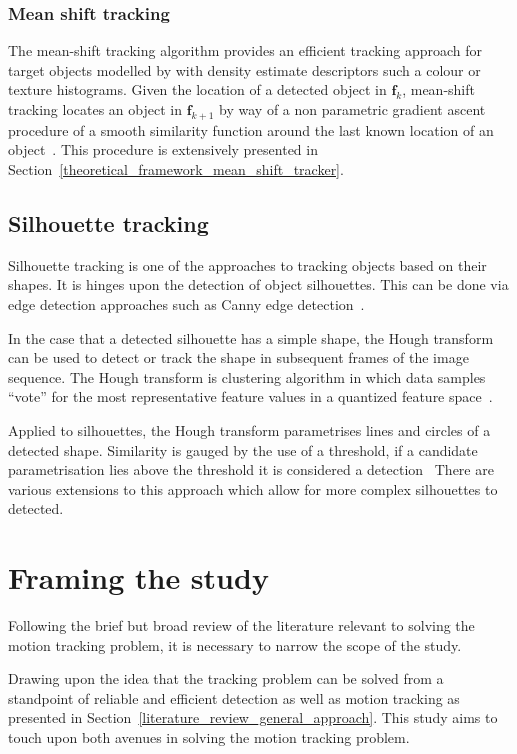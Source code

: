\subsubsection{Mean shift tracking}\label{literature_review_mean_shift}
The mean-shift tracking algorithm provides an efficient tracking approach for
target objects modelled by with density estimate descriptors such a colour or
texture histograms. 
Given the location of a detected object in $\mathbf{f}_k$, mean-shift tracking
locates an object in $\mathbf{f}_{k+1}$ by way of a
non parametric gradient ascent procedure of a smooth similarity function around
the last known location of an object~\cite{Comaniciu2003}. This procedure is
extensively presented in Section~\ref{theoretical_framework_mean_shift_tracker}.

\subsection{Silhouette tracking}
Silhouette tracking is one of the approaches to tracking objects based on their
shapes. It is hinges upon the detection of object silhouettes.  This can be done
via edge detection approaches such as Canny edge
detection~\cite{Delprado2013}.

In the case that a detected silhouette has a simple shape, the Hough transform
can be used to detect or track the shape in subsequent frames of the image
sequence. The Hough transform is clustering algorithm in which data samples
“vote” for the most representative feature values in a quantized feature
space~\cite{Tekalp2014}. 

Applied to silhouettes, the Hough transform parametrises lines and circles of a
detected shape. Similarity is gauged by the use of a threshold, if a candidate
parametrisation lies above the threshold it is considered a
detection~\cite{Delprado2013} There are various extensions to this approach
which allow for more complex silhouettes to detected. 

\section{Framing the study}\label{literature_review}
Following the brief but broad review of the literature relevant to solving the
motion tracking problem, it is necessary to narrow the scope of the study.

Drawing upon the idea that the tracking problem can be solved from a standpoint
of reliable and efficient detection as well as motion tracking as presented in
Section~\ref{literature_review_general_approach}. This study aims to touch upon
both avenues in solving the motion tracking problem.

